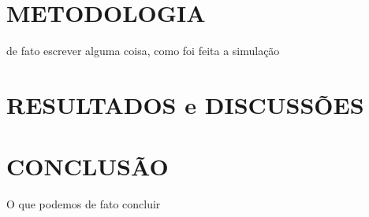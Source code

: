 \documentclass[a4paper,12pt]{article}
\begin{document}
\newpage


\thispagestyle{main}

\section{METODOLOGIA}\hspace{4ex}
de fato escrever alguma coisa, como foi feita a simulação
\newpage



\thispagestyle{main}

\section{RESULTADOS e DISCUSSÕES}\hspace{4ex}






\thispagestyle{main}

\section{CONCLUSÃO}\hspace{4ex}
O que podemos de fato concluir

\newpage




{}


\appendix


\end{document}

